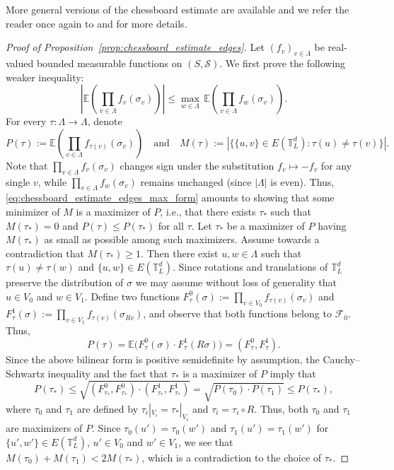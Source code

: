 \documentclass[12pt,reqno]{article}
\def\E{\mathbb{E}}
\def\T{\mathbb{T}}
\def\cS{\mathcal{S}}
\newcommand{\cF}{\mathcal{F}}
\begin{document}
More general versions of the chessboard estimate are available and we refer the reader once again to \cite{biskup2009reflection} and \cite[Chapter 10]{friedli2016statistical} for more details.
\begin{proof}[Proof of Proposition~\ref{prop:chessboard_estimate_edges}]
	Let $(f_v)_{v \in \Lambda}$ be real-valued bounded measurable functions on $(S,\cS)$. We first prove the following weaker inequality:
\begin{equation}\label{eq:chessboard_estimate_edges_max_form}
\left|\E\left(\prod_{v \in \Lambda} f_v(\sigma_v) \right)\right| \le \max_{w \in \Lambda}\, \E\left(\prod_{v \in \Lambda} f_w(\sigma_v)\right) .
\end{equation}
	For every $\tau \colon \Lambda \to \Lambda$, denote
	\[ P(\tau) := \E\left(\prod_{v \in \Lambda} f_{\tau(v)}(\sigma_v)\right) \quad\text{and}\quad M(\tau) := \left|\big\{ \{u,v\} \in E(\T_L^d) : \tau(u) \neq \tau(v) \big\} \right| .\]
Note that $\prod_{v \in \Lambda} f_v(\sigma_v)$ changes sign under the substitution $f_v \mapsto -f_v$ for any single $v$, while $\prod_{v \in \Lambda} f_w(\sigma_v)$ remains unchanged (since $|\Lambda|$ is even). Thus, \eqref{eq:chessboard_estimate_edges_max_form} amounts to showing that some minimizer of $M$ is a maximizer of $P$, i.e., that there exists $\tau_*$ such that $M(\tau_*)=0$ and $P(\tau) \le P(\tau_*)$ for all $\tau$. Let $\tau_*$ be a maximizer of $P$ having $M(\tau_*)$ as small as possible among such maximizers. Assume towards a contradiction that $M(\tau_*) \ge 1$. Then there exist $u,w \in \Lambda$ such that $\tau(u) \neq \tau(w)$ and $\{u,w\} \in E(\T_L^d)$. Since rotations and
	translations of $\T_L^d$ preserve the distribution of $\sigma$ we may assume without loss of generality that $u \in V_0$ and $w \in V_1$. Define two functions $F^0_\tau(\sigma) := \prod_{v \in V_0} f_{\tau(v)}(\sigma_v)$ and $F^1_\tau(\sigma) := \prod_{v \in V_1} f_{\tau(v)}(\sigma_{Rv})$, and observe that both functions belong to $\cF_0$. Thus,
	\[ P(\tau) = \E\Big(F^0_\tau(\sigma) \cdot F^1_\tau(R\sigma) \Big) = (F^0_\tau, F^1_\tau) .\]
	Since the above bilinear form is positive semidefinite by assumption, the Cauchy--Schwartz inequality and the fact that $\tau_*$ is a maximizer of $P$ imply that
	\[ P(\tau_*) \le \sqrt{(F^0_{\tau_*},F^0_{\tau_*}) \cdot (F^1_{\tau_*},F^1_{\tau_*})} = \sqrt{P(\tau_0) \cdot P(\tau_1)} \le P(\tau_*),\]
	where $\tau_0$ and $\tau_1$ are defined by $\tau_i|_{V_i}=\tau_*|_{V_i}$ and $\tau_i = \tau_i \circ R$. Thus, both $\tau_0$ and $\tau_1$ are maximizers of $P$. Since $\tau_0(u')=\tau_0(w')$ and $\tau_1(u')=\tau_1(w')$ for $\{u',w'\} \in E(\T_L^d)$, $u'\in V_0$ and $w'\in V_1$, we see that $M(\tau_0)+M(\tau_1) < 2M(\tau_*)$, which is a contradiction to the choice of $\tau_*$.
	

\end{proof}
\end{document}
